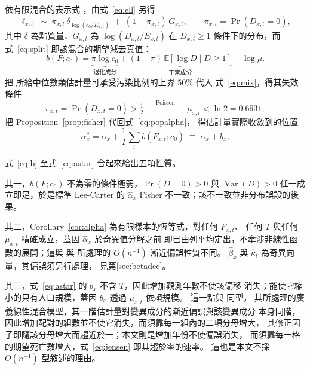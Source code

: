 \documentclass[UTF8, fontset=macnew, a4paper, 12pt]{ctexart}
\newcommand{\Ex}{\mathbb{E}}
\begin{document}
依有限混合的表示式 \citep[§1.2]{yao2024}，由式~\eqref{eq:ell} 另得
\begin{equation}\label{eq:mix}
\ell_{x,t}\;\sim\;\pi_{x,t}\,\delta_{\log(c_0/E_{x,t})}
\;+\;(1-\pi_{x,t})\,G_{x,t},
\qquad \pi_{x,t}=\Pr(D_{x,t}=0),
\end{equation}
其中 $\delta$ 為點質量、$G_{x,t}$ 為 $\log(D_{x,t}/E_{x,t})$ 在
$D_{x,t}\ge1$ 條件下的分布，而式~\eqref{eq:split} 即該混合的期望減去真值：
\begin{equation}\label{eq:bmix}
b(F;c_0)=\underbrace{\pi\log c_0}_{\text{退化成分}}
+\underbrace{(1-\pi)\,\Ex[\log D\mid D\ge1]}_{\text{正常成分}}-\log\mu .
\end{equation}
把 \citet{donoho1983} 所給中位數類估計量可承受污染比例的上界 $50\%$ 代入
式~\eqref{eq:mix}，得其失效條件
\begin{equation}\label{eq:ln2}
\pi_{x,t}=\Pr(D_{x,t}=0)>\tfrac12
\quad\xrightarrow{\ \text{Poisson}\ }\quad
\mu_{x,t}<\ln 2=0.6931 ;
\end{equation}
把 Proposition~\ref{prop:fisher} 代回式~\eqref{eq:popalpha}，
得估計量實際收斂到的位置
\begin{equation}\label{eq:astar}
\alpha_x^{\ast}=\alpha_x+\frac1T\sum_t b(F_{x,t};c_0)
\;\equiv\;\alpha_x+\bar b_x .
\end{equation}

式~\eqref{eq:b} 至式~\eqref{eq:astar} 合起來給出五項性質。

其一，$b(F;c_0)$ 不為零的條件極弱，$\Pr(D=0)>0$ 與
$\operatorname{Var}(D)>0$ 任一成立即足，於是標準 Lee-Carter 的 $\hat\alpha_x$ Fisher
不一致；該不一致並非分布誤設的後果。

其二，Corollary~\ref{cor:alpha} 為有限樣本的恆等式，對任何 $F_{x,t}$、
任何 $T$ 與任何 $\mu_{x,t}$ 精確成立，蓋因 $\hat\alpha_x$ 於奇異值分解之前
即已由列平均定出，不牽涉非線性函數的展開；這與 \citet{coxsnell1968} 與
\citet{firth1993} 所處理的 $O(n^{-1})$ 漸近偏誤性質不同。
$\hat\beta_x$ 與 $\hat\kappa_t$ 為奇異向量，其偏誤須另行處理，
見第\ref{sec:betadec}。

其三，式~\eqref{eq:astar} 的 $\bar b_x$ 不含 $T$，因此增加觀測年數不使該偏移
消失；能使它縮小的只有人口規模，蓋因 $\bar b_x$ 透過 $\mu_{x,t}$ 依賴規模。
這一點與 \citet{breslow1995} 同型。
其所處理的廣義線性混合模型，其一階估計量對變異成分的漸近偏誤與該變異成分
本身同階，因此增加配對的組數並不使它消失，而須靠每一組內的二項分母增大，
其修正因子即隨該分母增大而趨近於一；本文則是增加年份不使偏誤消失，
而須靠每一格的期望死亡數增大，式~\eqref{eq:jensen} 即其趨於零的速率。
這也是本文不採 $O(n^{-1})$ 型敘述的理由。
\end{document}
